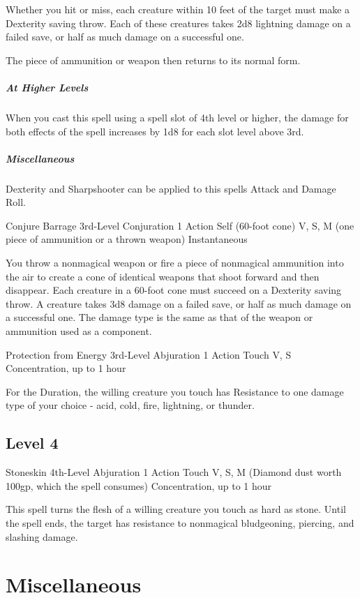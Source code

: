 \documentclass[letterpaper,openany,oneside,twocolumn]{book}
\begin{document}
Whether you hit or miss, each creature within 10 feet of the target must make a Dexterity saving throw. Each of these creatures takes 2d8 lightning damage on a failed save, or half as much damage on a successful one.

The piece of ammunition or weapon then returns to its normal form. 

\subparagraph*{At Higher Levels} When you cast this spell using a spell slot of 4th level or higher, the damage for both effects of the spell increases by 1d8 for each slot level above 3rd.

\subparagraph*{Miscellaneous} Dexterity and Sharpshooter can be applied to this spells Attack and Damage Roll.

\DndSpellHeader
  {Conjure Barrage}
  {3rd-Level Conjuration}
  {1 Action}
  {Self (60-foot cone)}
  {V, S, M (one piece of ammunition or a thrown weapon)}
  {Instantaneous}

You throw a nonmagical weapon or fire a piece of nonmagical ammunition into the air to create a cone of identical weapons that shoot forward and then disappear. Each creature in a 60-foot cone must succeed on a Dexterity saving throw. A creature takes 3d8 damage on a failed save, or half as much damage on a successful one. The damage type is the same as that of the weapon or ammunition used as a component.

\DndSpellHeader
  {Protection from Energy}
  {3rd-Level Abjuration}
  {1 Action}
  {Touch}
  {V, S}
  {Concentration, up to 1 hour}
  
For the Duration, the willing creature you touch has Resistance to one damage type of your choice - acid, cold, fire, lightning, or thunder.

\subsection*{Level 4}

\DndSpellHeader
  {Stoneskin}
  {4th-Level Abjuration}
  {1 Action}
  {Touch}
  {V, S, M (Diamond dust worth 100gp, which the spell consumes)}
  {Concentration, up to 1 hour}
  
This spell turns the flesh of a willing creature you touch as hard as stone. Until the spell ends, the target has resistance to nonmagical bludgeoning, piercing, and slashing damage.

\section*{Miscellaneous}
\end{document}

